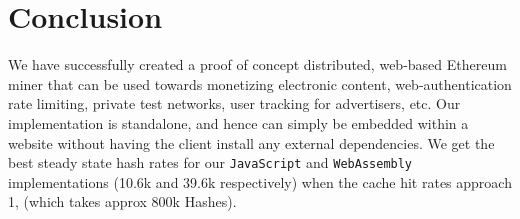 \documentclass[runningheads]{llncs}
\begin{document}

\section{Conclusion}
We have successfully created a proof of concept distributed, web-based Ethereum miner that can be used towards monetizing electronic content, web-authentication rate limiting, private test networks, user tracking for advertisers, etc. Our implementation is standalone, and hence can simply be embedded within a website without having the client install any external dependencies. We get the best steady state hash rates for our \verb|JavaScript| and \verb|WebAssembly| implementations (10.6k and 39.6k respectively) when the cache hit rates approach 1, (which takes approx 800k Hashes). 

\end{document}
